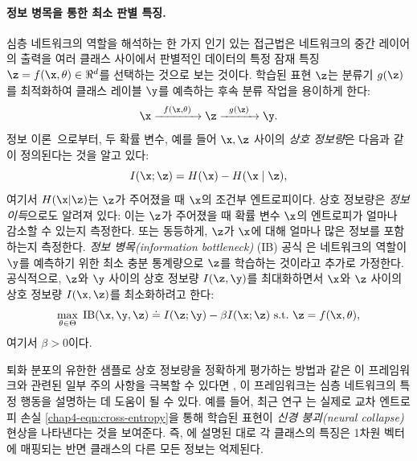 \documentclass[../../book-main_ko.tex]{subfiles}
\begin{document}
\paragraph{정보 병목을 통한 최소 판별 특징.}
심층 네트워크의 역할을 해석하는 한 가지 인기 있는 접근법은 네트워크의 중간 레이어의 출력을 여러 클래스 사이에서 판별적인 데이터의 특정 잠재 특징 $\z = f(\x, \theta) \in \Re^d$를 선택하는 것으로 보는 것이다. 학습된 표현 $\z$는 분류기 $g(\z)$를 최적화하여 클래스 레이블 $\y$를 예측하는 후속 분류 작업을 용이하게 한다:
\begin{equation}
	\x   \xrightarrow{\hspace{2mm} f(\x, \theta)\hspace{2mm}} \z  \xrightarrow{\hspace{2mm} g(\z) \hspace{2mm}} \y.
\end{equation}
정보 이론~\cite{Cover-Thomas}으로부터, 두 확률 변수, 예를 들어 $\x,\z$ 사이의 {\em 상호 정보량}은 다음과 같이 정의된다는 것을 알고 있다:
\begin{equation}
	I(\x; \z) = H(\x) - H(\x\mid \z),
\end{equation}
여기서 $H(\x \vert \z)$는 $\z$가 주어졌을 때 $\x$의 조건부 엔트로피이다. 상호 정보량은 {\em 정보 이득}으로도 알려져 있다: 이는 $\z$가 주어졌을 때 확률 변수 $\x$의 엔트로피가 얼마나 감소할 수 있는지 측정한다. 또는 동등하게, $\z$가 $\x$에 대해 얼마나 많은 정보를 포함하는지 측정한다. {\em 정보 병목(information bottleneck)} (IB) 공식 \cite{Tishby-ITW2015}은 네트워크의 역할이 $\y$를 예측하기 위한 최소 충분 통계량으로 $\z$를 학습하는 것이라고 추가로 가정한다. 공식적으로, $\z$와 $\y$ 사이의 상호 정보량 $I(\z, \y)$를 최대화하면서 $\x$와 $\z$ 사이의 상호 정보량 $I(\x, \z)$를 최소화하려고 한다:
\begin{equation}
	\max_{\theta\in \Theta}\; \mbox{IB}(\x, \y, \z) \doteq I(\z; \y) - \beta I(\x; \z)     \ \mathrm{s.t.}\ \z = f(\x, \theta),
	\label{chap4-eqn:information-bottleneck}
\end{equation}
여기서 $\beta >0$이다.

퇴화 분포의 유한한 샘플로 상호 정보량을 정확하게 평가하는 방법과 같은 이 프레임워크와 관련된 일부 주의 사항을 극복할 수 있다면 \cite{kolchinsky2018caveats-ICLR2018}, 이 프레임워크는 심층 네트워크의 특정 행동을 설명하는 데 도움이 될 수 있다.
예를 들어, 최근 연구 \cite{papyan2020prevalence}는 실제로 교차 엔트로피 손실 \eqref{chap4-eqn:cross-entropy}을 통해 학습된 표현이 \emph{신경 붕괴(neural collapse)} 현상을 나타낸다는 것을 보여준다.
즉, 에 설명된 대로 각 클래스의 특징은 1차원 벡터에 매핑되는 반면 클래스의 다른 모든 정보는 억제된다.
\end{document}
